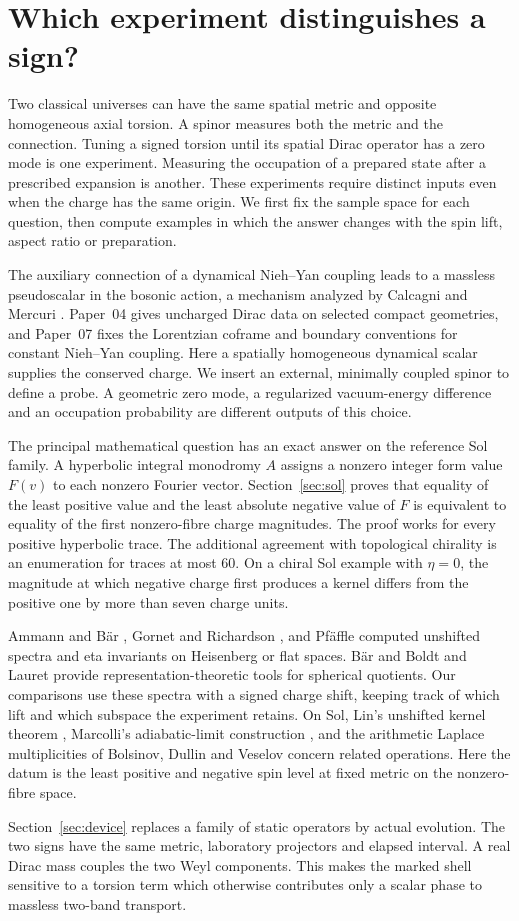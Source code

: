 \section{Which experiment distinguishes a sign?}
Two classical universes can have the same spatial metric and opposite homogeneous axial torsion. A spinor measures both the metric and the connection. Tuning a signed torsion until its spatial Dirac operator has a zero mode is one experiment. Measuring the occupation of a prepared state after a prescribed expansion is another. These experiments require distinct inputs even when the charge has the same origin. We first fix the sample space for each question, then compute examples in which the answer changes with the spin lift, aspect ratio or preparation.

The auxiliary connection of a dynamical Nieh--Yan coupling leads to a massless pseudoscalar in the bosonic action, a mechanism analyzed by Calcagni and Mercuri \cite{calcagni}. Paper~04 \cite{p04} gives uncharged Dirac data on selected compact geometries, and Paper~07 \cite{p07} fixes the Lorentzian coframe and boundary conventions for constant Nieh--Yan coupling. Here a spatially homogeneous dynamical scalar supplies the conserved charge. We insert an external, minimally coupled spinor to define a probe. A geometric zero mode, a regularized vacuum-energy difference and an occupation probability are different outputs of this choice.

The principal mathematical question has an exact answer on the reference Sol family. A hyperbolic integral monodromy \(A\) assigns a nonzero integer form value \(F(v)\) to each nonzero Fourier vector. Section~\ref{sec:sol} proves that equality of the least positive value and the least absolute negative value of \(F\) is equivalent to equality of the first nonzero-fibre charge magnitudes. The proof works for every positive hyperbolic trace. The additional agreement with topological chirality is an enumeration for traces at most 60. On a chiral Sol example with \(\eta=0\), the magnitude at which negative charge first produces a kernel differs from the positive one by more than seven charge units.

Ammann and B\"ar \cite{ammann}, Gornet and Richardson \cite{gornet}, and Pf\"affle \cite{pfaffle} computed unshifted spectra and eta invariants on Heisenberg or flat spaces. B\"ar \cite{baer} and Boldt and Lauret \cite{boldt} provide representation-theoretic tools for spherical quotients. Our comparisons use these spectra with a signed charge shift, keeping track of which lift and which subspace the experiment retains. On Sol, Lin's unshifted kernel theorem \cite[Lemma 4.2]{lin}, Marcolli's adiabatic-limit construction \cite{marcolli}, and the arithmetic Laplace multiplicities of Bolsinov, Dullin and Veselov \cite{bolsinov} concern related operations. Here the datum is the least positive and negative spin level at fixed metric on the nonzero-fibre space.

Section~\ref{sec:device} replaces a family of static operators by actual evolution. The two signs have the same metric, laboratory projectors and elapsed interval. A real Dirac mass couples the two Weyl components. This makes the marked shell sensitive to a torsion term which otherwise contributes only a scalar phase to massless two-band transport.
